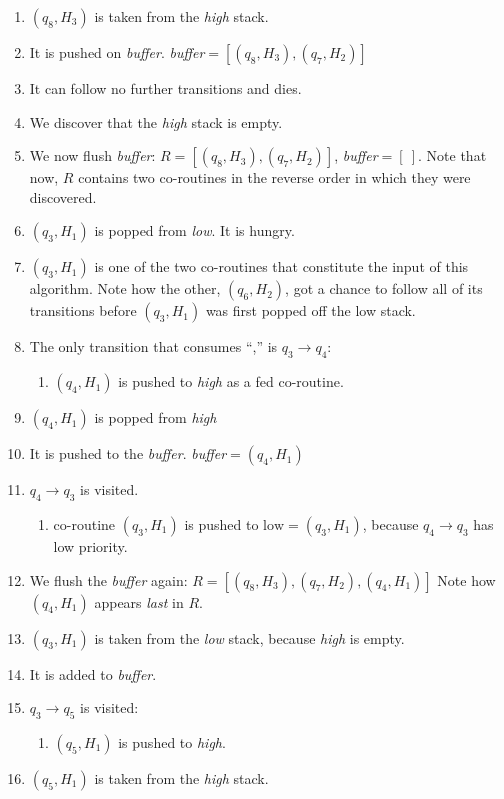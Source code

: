 \documentclass[11pt,a4paper,twoside,openright]{Thesis}
\theoremstyle{definition}
\begin{document}
\begin{example}
\begin{enumerate}
\begin{enumerate}
  \end{enumerate}
\item $(q_8, H_3)$ is taken from the \emph{high} stack.
\item It is pushed on \emph{buffer}. \emph{buffer}$=[(q_8, H_3), (q_7, H_2)]$
\item It can follow no further transitions and dies.
\item We discover that the \emph{high} stack is empty.
\item We now flush \emph{buffer}:
  $R=[(q_8, H_3), (q_7, H_2)]$, \emph{buffer}$=[\ ]$.  Note that now, $R$
  contains two co-routines in the reverse order in which they were discovered.
\item $(q_3, H_1)$ is popped from \emph{low}. It is hungry.
\item  $(q_3, H_1)$ is one of the two co-routines that constitute the
	input of this algorithm. Note how the other, $(q_6, H_2)$, got a
	chance to follow all of its transitions before $(q_3, H_1)$ was
	first popped off the low stack.
\item The only transition that consumes ``,'' is $q_3\rightarrow q_4$:\begin{enumerate}
	\item $(q_4, H_1)$ is pushed to \emph{high} as a fed co-routine.
\end{enumerate}
\item $(q_4, H_1)$ is popped from \emph{high}
\item It is pushed to the \emph{buffer}. \emph{buffer}$=(q_4, H_1)$
\item $q_4\rightarrow q_3$ is visited.
\begin{enumerate}
	\item co-routine $(q_3, H_1)$ is pushed to 
	$ \mbox{low} = (q_3, H_1)$, 
	because $q_4\rightarrow q_3$ has low priority.
\end{enumerate}
\item We flush the \emph{buffer} again: $R=[(q_8, H_3), (q_7, H_2), (q_4, H_1)]$
	Note how $(q_4, H_1)$ appears \emph{last} in $R$.
\item $(q_3, H_1)$ is taken from the \emph{low} stack, because \emph{high} is
  empty.
\item It is added to \emph{buffer}.
\item $q_3\rightarrow q_5$ is visited:\begin{enumerate}
	\item $(q_5, H_1)$ is pushed to \emph{high}.
\end{enumerate}
\item $(q_5, H_1)$ is taken from the \emph{high} stack.

\end{enumerate}
\end{example}
\end{document}
